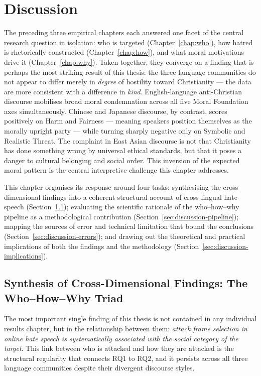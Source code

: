 \documentclass[../CLthesis.tex]{subfiles}
\begin{document}
\chapter{Discussion}%
\label{chap:discussion}

The preceding three empirical chapters each answered one facet of the central research question in isolation: who is targeted (Chapter~\ref{chap:who}), how hatred is rhetorically constructed (Chapter~\ref{chap:how}), and what moral motivations drive it (Chapter~\ref{chap:why}). Taken together, they converge on a finding that is perhaps the most striking result of this thesis: the three language communities do not appear to differ merely in \emph{degree} of hostility toward Christianity --- the data are more consistent with a difference in \emph{kind}. English-language anti-Christian discourse mobilises broad moral condemnation across all five Moral Foundation axes simultaneously. Chinese and Japanese discourse, by contrast, scores positively on Harm and Fairness --- meaning speakers position themselves as the morally upright party --- while turning sharply negative only on Symbolic and Realistic Threat. The complaint in East Asian discourse is not that Christianity has done something wrong by universal ethical standards, but that it poses a danger to cultural belonging and social order. This inversion of the expected moral pattern is the central interpretive challenge this chapter addresses.

This chapter organises its response around four tasks: synthesising the cross-dimensional findings into a coherent structural account of cross-lingual hate speech (Section~\ref{sec:discussion-synthesis}); evaluating the scientific rationale of the who--how--why pipeline as a methodological contribution (Section~\ref{sec:discussion-pipeline}); mapping the sources of error and technical limitation that bound the conclusions (Section~\ref{sec:discussion-errors}); and drawing out the theoretical and practical implications of both the findings and the methodology (Section~\ref{sec:discussion-implications}).

\section{Synthesis of Cross-Dimensional Findings: The Who--How--Why Triad}
\label{sec:discussion-synthesis}

The most important single finding of this thesis is not contained in any individual results chapter, but in the relationship between them: \emph{attack frame selection in online hate speech is systematically associated with the social category of the target}. This link between who is attacked and how they are attacked is the structural regularity that connects RQ1 to RQ2, and it persists across all three language communities despite their divergent discourse styles.
\end{document}
